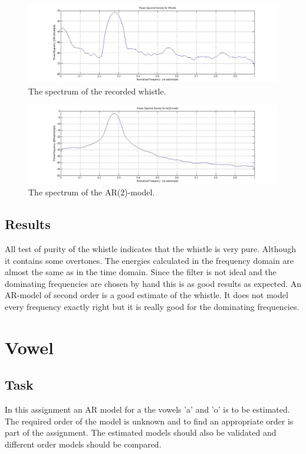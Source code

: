 \documentclass[12pt]{article}
\begin{document}
\begin{figure}[H]
\centering
\includegraphics[width=14cm]{psdwhis.jpg}
\caption{The spectrum of the recorded whistle.\label{psdwhis}}
\end{figure}

\begin{figure}[H]
\centering
\includegraphics[width=14cm]{psdar2.jpg}
\caption{The spectrum of the AR(2)-model.\label{psdar2}}
\end{figure}


\subsection{Results}
All test of purity of the whistle indicates that the whistle is very pure. Although it contains some overtones. The energies calculated in the frequency domain are almost the same as in the time domain. Since the filter is not ideal and the dominating frequencies are chosen by hand this is as good results as expected. An AR-model of second order is a good estimate of the whistle. It does not model every frequency exactly right but it is really good for the dominating frequencies. 

\section{Vowel}

\subsection{Task}
In this assignment an AR model for a the vowels 'a' and 'o' is to be estimated.
The required order of the model is unknown and to find an appropriate order is part of the assignment.
The estimated models should also be validated and different order models should be compared.
\end{document}
